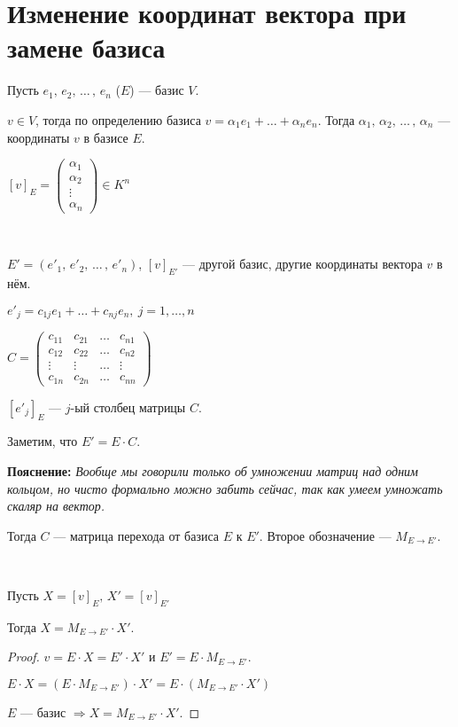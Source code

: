 \section{Изменение координат вектора при замене базиса}

\begin{conj} 
    
    Пусть $e_1,\, e_2,\, \dots\, ,\, e_n$ ($E$) --- базис $V$. 
    
    $v \in V$, тогда по определению базиса $v = \alpha_1 e_1 + \dots + \alpha_n e_n$. 
    Тогда $\alpha_1,\, \alpha_2,\, \dots\, ,\, \alpha_n$ --- координаты $v$ в базисе $E$.

    $[v]_E =
        \begin{pmatrix}
            \alpha_1\\
            \alpha_2\\
            \vdots\\
            \alpha_n
        \end{pmatrix}
    \in K^n$
\end{conj}
\
\begin{conj}


    $E' = (e'_1,\, e'_2,\, \dots\, ,\, e'_n)$, $[v]_{E'}$ --- другой базис, другие координаты вектора $v$ в нём.

    $e'_j = c_{1j}e_1 + \dots + c_{nj}e_n,\ j = 1, \dots, n$

    $C =
        \begin{pmatrix}
            c_{11} & c_{21} & \dots & c_{n1} \\
            c_{12} & c_{22} & \dots & c_{n2} \\
            \vdots & \vdots & \dots & \vdots \\
            c_{1n} & c_{2n} & \dots & c_{nn}
        \end{pmatrix}
    $

    $[e'_j]_E$ --- $j$-ый столбец матрицы $C$.

    Заметим, что $E' = E \cdot C$.


    \textbf{Пояснение:}
    \emph{Вообще мы говорили только об умножении матриц над одним кольцом, но чисто формально можно забить сейчас, так как умеем умножать скаляр на вектор.}

    Тогда $C$ --- матрица перехода от базиса $E$ к $E'$. Второе обозначение --- $M_{E \to E'}$.


\end{conj}
\
\begin{theorem-non} 
    
    Пусть $X = [v]_E,\, X' = [v]_{E'}$

    Тогда $X = M_{E \to E'} \cdot X'$.
    \begin{proof}
        
        $v = E \cdot X = E' \cdot X'$ и $E' = E \cdot M_{E \to E'}$.

        $E \cdot X = (E \cdot M_{E \to E'}) \cdot X' = E \cdot (M_{E \to E'} \cdot X')$

        $E$ --- базис $\Longrightarrow X = M_{E \to E'} \cdot X'$.

    \end{proof}
\end{theorem-non}





